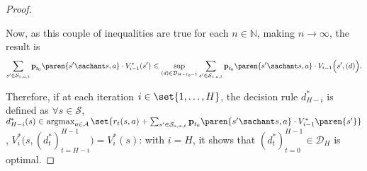 \begin{proof}
\begin{itemize}
Now, as this couple of inequalities are true 
for each $n \in \mathbb{N}$, 
making $n \rightarrow \infty$, the result is
\[ \sum_{s' \in \mathcal{S}_{s,a,t}} \textbf{p}_{t_0} \paren{ s' \sachant s,a} \cdot V^*_{i-1}(s')  \leqslant \sup_{(d) \in \mathcal{D}_{H-t_0-1}} \sum_{s' \in \mathcal{S}_{s,a,t}} \textbf{p}_{t_0} \paren{ s' \sachant s,a} \cdot V_{i-1}\Big(s', (d)\Big). \] 
\end{itemize}
Therefore, if at each iteration $i \in \set{ 1, \ldots, H }$,
the decision rule $d^*_{H-i}$ is defined as $\forall s \in \mathcal{S}$,
$d_{H-i}^*(s) \in \operatorname*{argmax}_{a \in \mathcal{A}} \set{ r_t(s,a) 
+ \sum_{s' \in \mathcal{S}_{s,a,t}} \textbf{p}_{t_0} \paren{s' \sachant s , a } \cdot V_{i-1}^* \paren{ s' } }$, $V^*_i \Big( s, (d^*_t)_{t = H-i}^{H-1} \Big) = V^*_i(s)$:
with $i = H$, it shows that $(d^*_t)_{t=0}^{H-1} \in \mathcal{D}_H$ is optimal.
\end{proof}








